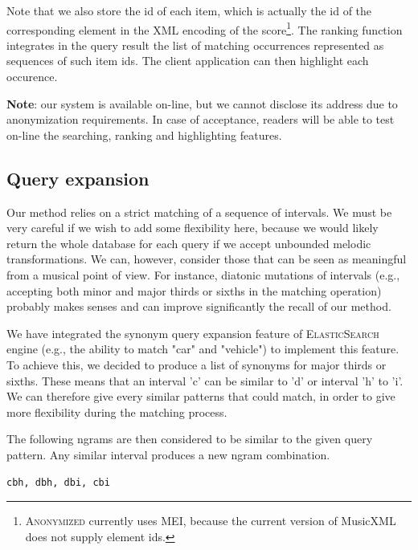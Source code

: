 \documentclass[letterpaper, 11pt]{article}
\def\neuma/{\textsc{Anonymized}}
\def\elasticsearch/{\textsc{ElasticSearch}}
\begin{document}
Note that we also store the id of each item, which is actually the id of the corresponding
element in the XML encoding of the score\footnote{\neuma/ currently
uses MEI, because the current version of MusicXML does not supply element ids.}. The ranking function
integrates in the query result the list of matching occurrences represented as sequences
of such item ids. The client application can then highlight each occurence. 

\noindent
\textbf{Note}: our system is available on-line, but we cannot disclose its address due to anonymization requirements.
In case of acceptance, readers will be able to test on-line the searching, ranking and highlighting features.


\subsection{Query expansion}

Our method relies on a strict matching of a sequence of intervals. 
We must be very careful if we wish to add some flexibility here, because we would likely return the whole database
for each query if we accept unbounded melodic transformations. We can, however, consider those that
can be seen as meaningful from a musical point of view. For instance, diatonic mutations of intervals
(e.g., accepting both minor and major thirds or sixths in the matching operation) probably makes senses 
and can improve significantly the recall of our method.

We have integrated the synonym query expansion 
feature of \elasticsearch/ engine (e.g., the ability to match "car" and "vehicle")
to implement this feature.  To achieve this, we decided to produce a list of synonyms for major thirds or sixths.
These means that an interval 'c' can be similar to 'd' or interval 'h' to 'i'.
We can therefore give every similar patterns that could match, in order to give more flexibility during the matching process.

The following ngrams are then considered to be similar to the given query pattern. Any similar interval produces a new ngram combination. 

\begin{verbatim}
cbh, dbh, dbi, cbi
\end{verbatim}
\end{document}
